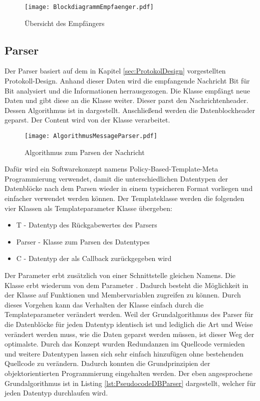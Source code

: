 \begin{figure}[H]
\centering
\texttt{[image: BlockdiagrammEmpfaenger.pdf]}
\caption{Übersicht des Empfängers}
\label{fig:BlockdiagrammEmpfaenger}
\end{figure}

\subsection{Parser}

Der Parser basiert auf dem in Kapitel \ref{sec:ProtokolDesign}
vorgestellten Protokoll-Design.
Anhand dieser Daten wird die empfangende Nachricht Bit für Bit analysiert
und die Informationen herrausgezogen. 
Die Klasse  empfängt neue Daten und gibt diese an
die Klasse  weiter. Dieser parst den Nachrichtenheader.
Dessen Algorithmus ist in  dargestellt.
Anschließend werden die Datenblockheader geparst. Der Content wird von der
Klasse  verarbeitet.

\begin{figure}[H]
\centering
\texttt{[image: AlgorithmusMessageParser.pdf]}
\caption{Algorithmus zum Parsen der Nachricht}
\label{fig:AlgorithmusMessageParser}
\end{figure}

Dafür wird ein Softwarekonzept namens Policy-Based-Template-Meta Programmierung
 verwendet, damit die unterschiedlichen Datentypen der
Datenblöcke nach dem Parsen wieder in einem typsicheren Format vorliegen und
einfacher verwendet werden können.
Der Templateklasse werden die folgenden vier Klassen als Templateparameter
Klasse übergeben:

\begin{itemize}
\item T - Datentyp des Rückgabewertes des Parsers
\item Parser - Klasse zum Parsen des Datentypes
\item C - Datentyp der als Callback zurückgegeben wird
\end{itemize}

Der Parameter  erbt zusätzlich von einer
Schnittstelle gleichen Namens. Die Klasse  erbt
wiederum von dem Parameter .
Dadurch besteht die Möglichkeit in der Klasse auf Funktionen und
Membervariablen zugreifen zu können.
Durch dieses Vorgehen kann das Verhalten der Klasse einfach durch die
Templateparameter verändert werden. Weil der Grundalgorithmus des Parser für
die Datenblöcke für jeden Datentyp identisch ist und lediglich die Art und
Weise verändert werden muss, wie die Daten geparst werden müssen,
ist dieser Weg der optimalste. Durch das Konzept wurden
Redundanzen im Quellcode vermieden und weitere Datentypen lassen sich
sehr einfach hinzufügen ohne bestehenden Quellcode zu verändern. Dadurch konnten
die Grundprinzipien der objektorientierten Programmierung 
eingehalten werden.
Der eben angesprochene Grundalgorithmus ist in Listing 
\ref{lst:PseudocodeDBParser} dargestellt, welcher für jeden Datentyp
durchlaufen wird.

